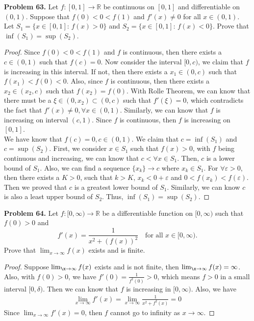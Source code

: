 \documentclass[12pt,leqno]{amsart}
\begin{document}
\noindent
{\bf Problem 63.}
Let $f:[0,1]\to\mathbb{R}$ be continuous on $[0,1]$ and differentiable on $(0,1)$. Suppose that $f(0)<0<f(1)$ and $f'(x)\neq 0$ for all $x\in (0,1)$. Let
$S_1=\{x\in [0,1]:\,f(x)>0\}$ and $S_2=\{x\in [0,1]:\,   f(x)<0\}$. Prove that $\inf(S_1)=\sup(S_2)$.
\begin{proof}
Since $f(0)<0<f(1)$ and $f$ is continuous, then there exists a $c\in(0,1)$ such that $f(c)=0$. Now consider the interval $[0,c)$, we claim that $f$ is increasing in this interval. If not, then there exists a $x_1\in(0,c)$ such that $f(x_1)<f(0)<0$. Also, since $f$ is continuous, then there exists a $x_2\in(x_2,c)$ such that $f(x_2)=f(0)$. With Rolle Theorem, we can know that there must be a $\xi\in(0,x_2)\subset (0,c)$ such that $f'(\xi)=0$, which contradicts the fact that $f'(x)\neq 0, \forall x\in(0,1)$. Similarly, we can know that $f$ is increasing on interval $(c,1)$. Since $f$ is continuous, then $f$ is increasing on $[0,1]$. \\
\hspace*{3em}We have know that $f(c)=0, c\in(0,1)$. We claim that $c=\inf (S_1)$ and $c=\sup (S_2)$. First, we consider $x\in S_1$ such that $f(x)>0$, with $f$ being continuous and increasing, we can know that $c<\forall x\in S_1$. Then, $c$ is a lower bound of $S_1$. Also, we can find a sequence $\{x_k\}\rightarrow c$ where $x_k\in S_1$. For $\forall \varepsilon>0$, then there exists a $K>0$, such that $k>K$, $x_k<0+\varepsilon$ and $0<f(x_k)<f(\varepsilon)$. Then we proved that $c$ is a greatest lower bound of $S_1$. Similarly, we can know $c$ is also a least upper bound of $S_2$. Thus, $\inf(S_1)=\sup(S_2)$.
\end{proof}

\medskip


\noindent
{\bf Problem 64.}
Let $f:[0,\infty)\to\mathbb{R}$ be a differentiable function on $[0,\infty)$ such that $f(0)>0$ and
$$
f'(x)=\frac{1}{x^2+(f(x))^2}
\quad
\text{for all $x\in [0,\infty)$.}
$$
Prove that $\lim_{x\to\infty} f(x)$ exists and is finite.
\begin{proof}
Suppose $\lim_{\x\to\infty}f(x)$ exists and is not finite, then $\lim_{\x\to\infty}f(x)=\infty$. Also, with $f(0)>0$, we have $f'(0)=\frac{1}{f^2(0)}>0$, which means $f>0$ in a small interval $[0,\delta)$. Then we can know that $f$ is increasing in $[0,\infty)$. Also, we have 
\begin{align*}
    \lim_{x\to\infty}f'(x)=\lim_{x\to\infty}\frac{1}{x^2+f^2(x)}=0
\end{align*}
Since $\lim_{x\to\infty}f'(x)=0$, then $f$ cannot go to infinity as $x\rightarrow \infty$.
\end{proof}
\end{document}
